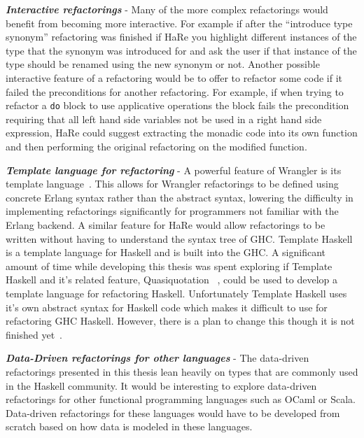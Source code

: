 \textit{\textbf{Interactive refactorings}} - Many of the more complex refactorings would benefit from becoming more interactive. For example if after the ``introduce type synonym'' refactoring was finished if HaRe you highlight different instances of the type that the synonym was introduced for and ask the user if that instance of the type should be renamed using the new synonym or not. Another possible interactive feature of a refactoring would be to offer to refactor some code if it failed the preconditions for another refactoring. For example, if when trying to refactor a \texttt{do} block to use applicative operations the block fails the precondition requiring that all left hand side variables not be used in a right hand side expression, HaRe could suggest extracting the monadic code into its own function and then performing the original refactoring on the modified function.

\textit{\textbf{Template language for refactoring}} - A powerful feature of Wrangler is its template language~\citep{letsUser}. This allows for Wrangler refactorings to be defined using concrete Erlang syntax rather than the abstract syntax, lowering the difficulty in implementing refactorings significantly for programmers not familiar with the Erlang backend. A similar feature for HaRe would allow refactorings to be written without having to understand the syntax tree of GHC. Template Haskell is a template language for Haskell and is built into the GHC. A significant amount of time while developing this thesis was spent exploring if Template Haskell and it's related feature, Quasiquotation ~\citep{quasi}, could be used to develop a template language for refactoring Haskell. Unfortunately Template Haskell uses it's own abstract syntax for Haskell code which makes it difficult to use for refactoring GHC Haskell. However, there is a plan to change this though it is not finished yet~\citep{ghcTreesGrow}.


\textit{\textbf{Data-Driven refactorings for other languages}} - The data-driven refactorings presented in this thesis lean heavily on types that are commonly used in the Haskell community. It would be interesting to explore data-driven refactorings for other functional programming languages such as OCaml or Scala. Data-driven refactorings for these languages would have to be developed from scratch based on how data is modeled in these languages.







\cleardoublepage
{}
\label{index}
\printindex


